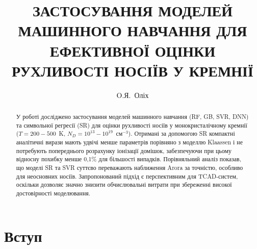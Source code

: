 \documentclass[fleqn,twoside,twocolumn,nofootinbib,showkeys]{revtex4} %
\begin{document}
\title[Застосування моделей машинного навчання для оцінки рухливості носіїв у Si]%
{ЗАСТОСУВАННЯ МОДЕЛЕЙ МАШИННОГО НАВЧАННЯ ДЛЯ ЕФЕКТИВНОЇ ОЦІНКИ РУХЛИВОСТІ НОСІЇВ У КРЕМНІЇ}
\author{O.Я.~Оліх}%
\address{Україна, 01601, місто Київ, вул. Володимирська, 64/13}%

  \razd{\secvii}



\setcounter{page}{1}

\begin{abstract}
У роботі досліджено застосування моделей машинного навчання (RF, GB, SVR, DNN)
та символьної регресії (SR) для оцінки рухливості носіїв у монокристалічному кремнії
($T=200-500$~K, $N_D=10^{13}-10^{19}$~см$^{-3}$).
Отримані за допомогою SR компактні аналітичні вирази мають удвічі менше параметрів порівняно
з моделлю Klaassen і не потребують попереднього розрахунку іонізації домішок,
забезпечуючи при цьому відносну похибку менше 0,1\% для більшості випадків.
Порівняльний аналіз показав, що моделі SR та SVR суттєво переважають наближення Arora за точністю,
особливо для неосновних носіїв.
Запропонований підхід є перспективним для TCAD-систем, оскільки дозволяє значно знизити обчислювальні
витрати при збереженні високої достовірності моделювання.
\end{abstract}


\maketitle

\section{Вступ}\label{Vstup}
\end{document}
